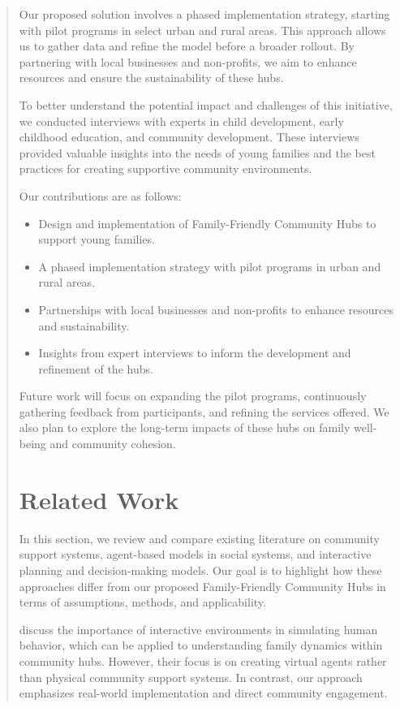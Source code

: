 \documentclass{article} %
\begin{document}
\begin{abstract}
Our proposed solution involves a phased implementation strategy, starting with pilot programs in select urban and rural areas. This approach allows us to gather data and refine the model before a broader rollout. By partnering with local businesses and non-profits, we aim to enhance resources and ensure the sustainability of these hubs.

To better understand the potential impact and challenges of this initiative, we conducted interviews with experts in child development, early childhood education, and community development. These interviews provided valuable insights into the needs of young families and the best practices for creating supportive community environments.

Our contributions are as follows:
\begin{itemize}
    \item Design and implementation of Family-Friendly Community Hubs to support young families.
    \item A phased implementation strategy with pilot programs in urban and rural areas.
    \item Partnerships with local businesses and non-profits to enhance resources and sustainability.
    \item Insights from expert interviews to inform the development and refinement of the hubs.
\end{itemize}

Future work will focus on expanding the pilot programs, continuously gathering feedback from participants, and refining the services offered. We also plan to explore the long-term impacts of these hubs on family well-being and community cohesion.

\section{Related Work}
\label{sec:related}

In this section, we review and compare existing literature on community support systems, agent-based models in social systems, and interactive planning and decision-making models. Our goal is to highlight how these approaches differ from our proposed Family-Friendly Community Hubs in terms of assumptions, methods, and applicability.

\citet{park2023generative} discuss the importance of interactive environments in simulating human behavior, which can be applied to understanding family dynamics within community hubs. However, their focus is on creating virtual agents rather than physical community support systems. In contrast, our approach emphasizes real-world implementation and direct community engagement.


\end{abstract}
\end{document}
